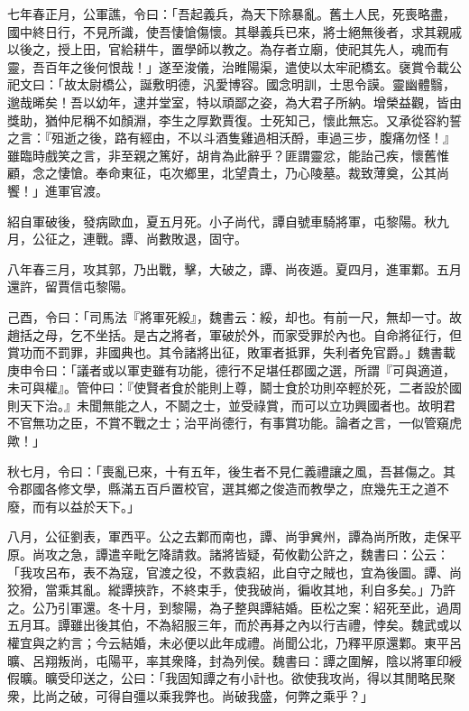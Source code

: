 \begin{pinyinscope}
七年春正月，公軍譙，令曰：「吾起義兵，為天下除暴亂。舊土人民，死喪略盡，國中終日行，不見所識，使吾悽愴傷懷。其舉義兵已來，將士絕無後者，求其親戚以後之，授上田，官給耕牛，置學師以教之。為存者立廟，使祀其先人，魂而有靈，吾百年之後何恨哉！」遂至浚儀，治睢陽渠，遣使以太牢祀橋玄。襃賞令載公祀文曰：「故太尉橋公，誕敷明德，汎愛博容。國念明訓，士思令謨。靈幽體翳，邈哉晞矣！吾以幼年，逮并堂室，特以頑鄙之姿，為大君子所納。增榮益觀，皆由獎助，猶仲尼稱不如顏淵，李生之厚歎賈復。士死知己，懷此無忘。又承從容約誓之言：『殂逝之後，路有經由，不以斗酒隻雞過相沃酹，車過三步，腹痛勿怪！』雖臨時戲笑之言，非至親之篤好，胡肯為此辭乎？匪謂靈忿，能詒己疾，懷舊惟顧，念之悽愴。奉命東征，屯次鄉里，北望貴土，乃心陵墓。裁致薄奠，公其尚饗！」進軍官渡。

紹自軍破後，發病歐血，夏五月死。小子尚代，譚自號車騎將軍，屯黎陽。秋九月，公征之，連戰。譚、尚數敗退，固守。

八年春三月，攻其郭，乃出戰，擊，大破之，譚、尚夜遁。夏四月，進軍鄴。五月還許，留賈信屯黎陽。

己酉，令曰：「司馬法『將軍死綏』，魏書云：綏，却也。有前一尺，無却一寸。故趙括之母，乞不坐括。是古之將者，軍破於外，而家受罪於內也。自命將征行，但賞功而不罰罪，非國典也。其令諸將出征，敗軍者抵罪，失利者免官爵。」魏書載庚申令曰：「議者或以軍吏雖有功能，德行不足堪任郡國之選，所謂『可與適道，未可與權』。管仲曰：『使賢者食於能則上尊，鬬士食於功則卒輕於死，二者設於國則天下治。』未聞無能之人，不鬬之士，並受祿賞，而可以立功興國者也。故明君不官無功之臣，不賞不戰之士；治平尚德行，有事賞功能。論者之言，一似管窺虎歟！」

秋七月，令曰：「喪亂已來，十有五年，後生者不見仁義禮讓之風，吾甚傷之。其令郡國各修文學，縣滿五百戶置校官，選其鄉之俊造而教學之，庶幾先王之道不廢，而有以益於天下。」

八月，公征劉表，軍西平。公之去鄴而南也，譚、尚爭兾州，譚為尚所敗，走保平原。尚攻之急，譚遣辛毗乞降請救。諸將皆疑，荀攸勸公許之，魏書曰：公云：「我攻呂布，表不為寇，官渡之役，不救袁紹，此自守之賊也，宜為後圖。譚、尚狡猾，當乘其亂。縱譚挾詐，不終束手，使我破尚，徧收其地，利自多矣。」乃許之。公乃引軍還。冬十月，到黎陽，為子整與譚結婚。臣松之案：紹死至此，過周五月耳。譚雖出後其伯，不為紹服三年，而於再朞之內以行吉禮，悖矣。魏武或以權宜與之約言；今云結婚，未必便以此年成禮。尚聞公北，乃釋平原還鄴。東平呂曠、呂翔叛尚，屯陽平，率其衆降，封為列侯。魏書曰：譚之圍解，陰以將軍印綬假曠。曠受印送之，公曰：「我固知譚之有小計也。欲使我攻尚，得以其閒略民聚衆，比尚之破，可得自彊以乘我弊也。尚破我盛，何弊之乘乎？」


\end{pinyinscope}
